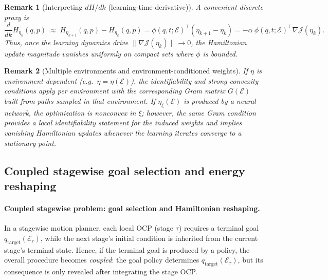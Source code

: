 \documentclass{article} %
\newtheorem*{remark}{Remark}
\begin{document}
\begin{remark}[Interpreting $dH/dk$ (learning-time derivative)]
A convenient discrete proxy is
\[
\frac{d}{dk}H_{\eta_k}(q,p)\;\approx\;H_{\eta_{k+1}}(q,p)-H_{\eta_k}(q,p)
=\phi(q,t;\mathcal E)^\top(\eta_{k+1}-\eta_k)
=-\alpha~\phi(q,t;\mathcal E)^\top\nabla\mathcal J(\eta_k).
\]
Thus, once the learning dynamics drive $\|\nabla\mathcal J(\eta_k)\|\to 0$, the Hamiltonian update magnitude
vanishes uniformly on compact sets where $\phi$ is bounded.
\end{remark}

\begin{remark}[Multiple environments and environment-conditioned weights]
If $\eta$ is environment-dependent (e.g.\ $\eta=\eta(\mathcal E)$), the identifiability and strong convexity conditions
apply \emph{per environment} with the corresponding Gram matrix $G(\mathcal E)$ built from paths sampled in that environment.
If $\eta_\xi(\mathcal E)$ is produced by a neural network, the optimization is nonconvex in $\xi$; however, the same Gram
condition provides a \emph{local} identifiability statement for the induced weights and implies vanishing Hamiltonian updates
whenever the learning iterates converge to a stationary point.
\end{remark}
\subsection{Coupled stagewise goal selection and energy {reshaping}}
\label{app:coupled_stagewise}


\paragraph{Coupled stagewise problem: goal selection and Hamiltonian {reshaping}.}
In a stagewise motion planner, each local OCP (stage $\tau$) requires a terminal goal
$q_{\mathrm{target}}(\mathcal{E}_{\tau})$, while the next stage’s initial condition is inherited from the current stage’s terminal state.
Hence, if the terminal goal is produced by a policy, the overall procedure becomes \emph{coupled}:
the goal policy determines $q_{\mathrm{target}}(\mathcal{E}_{\tau})$, but its consequence is only revealed after integrating the stage OCP.
\end{document}

